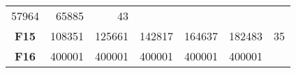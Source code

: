 \documentclass[12pt,a4paper]{article}
\begin{document}
\begin{longtable}[c]{@{}crrrrrr@{}}
\begin{minipage}[t]{0.10\columnwidth}
57964
\strut\end{minipage} &
\begin{minipage}[t]{0.11\columnwidth}\raggedleft\strut
65885
\strut\end{minipage} &
\begin{minipage}[t]{0.07\columnwidth}\raggedleft\strut
43
\strut\end{minipage}\tabularnewline
\begin{minipage}[t]{0.11\columnwidth}\centering\strut
\textbf{F15}
\strut\end{minipage} &
\begin{minipage}[t]{0.08\columnwidth}\raggedleft\strut
108351
\strut\end{minipage} &
\begin{minipage}[t]{0.08\columnwidth}\raggedleft\strut
125661
\strut\end{minipage} &
\begin{minipage}[t]{0.09\columnwidth}\raggedleft\strut
142817
\strut\end{minipage} &
\begin{minipage}[t]{0.10\columnwidth}\raggedleft\strut
164637
\strut\end{minipage} &
\begin{minipage}[t]{0.11\columnwidth}\raggedleft\strut
182483
\strut\end{minipage} &
\begin{minipage}[t]{0.07\columnwidth}\raggedleft\strut
35
\strut\end{minipage}\tabularnewline
\begin{minipage}[t]{0.11\columnwidth}\centering\strut
\textbf{F16}
\strut\end{minipage} &
\begin{minipage}[t]{0.08\columnwidth}\raggedleft\strut
400001
\strut\end{minipage} &
\begin{minipage}[t]{0.08\columnwidth}\raggedleft\strut
400001
\strut\end{minipage} &
\begin{minipage}[t]{0.09\columnwidth}\raggedleft\strut
400001
\strut\end{minipage} &
\begin{minipage}[t]{0.10\columnwidth}\raggedleft\strut
400001
\strut\end{minipage} &
\begin{minipage}[t]{0.11\columnwidth}\raggedleft\strut
400001
\strut\end{minipage} &
\begin{minipage}[t]{0.07\columnwidth}\raggedleft\strut

\end{minipage}
\end{longtable}
\end{document}
